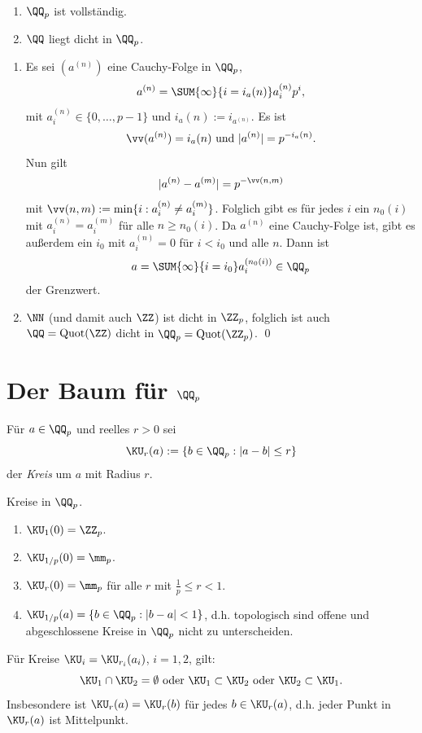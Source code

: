 \PROP\ \begin{enumerate}
\item $\QQ_p$ ist vollständig.
\item $\QQ$ liegt dicht in $\QQ_p$.
\end{enumerate}
\bew \begin{enumerate}
\item Es sei $(a^{(n)})$ eine Cauchy-Folge in $\QQ_p$,
\[
a^{(n)} = \SUM{\infty}{i=i_a(n)} a_i^{(n)} p^i,
\]
mit $a_i^{(n)}\in\{0,\ldots,p-1\}$ und $i_a(n):=i_{a^{(n)}}$.
Es ist
\[
\vv(a^{(n)}) = i_a(n) \text{ und } |a^{(n)}|=p^{-i_a(n)}.
\]
Nun gilt
\[
|a^{(n)}-a^{(m)}| = p^{-\vv(n,m)}
\]
mit $\vv(n,m):=\min\{i:a_i^{(n)}\neq a_i^{(m)}\}$.
Folglich gibt es für jedes $i$ ein $n_0(i)$ mit $a^{(n)}_i=a^{(m)}_i$
für alle $n\geq n_0(i)$.
Da $a^{(n)}$ eine Cauchy-Folge ist, gibt es außerdem ein $i_0$
mit $a_i^{(n)}=0$ für $i<i_0$ und alle $n$.
Dann ist
\[
a = \SUM{\infty}{i=i_0} a_i^{(n_0(i))} \in \QQ_p
\]
der Grenzwert.
\item $\NN$ (und damit auch $\ZZ$) ist dicht in $\ZZ_p$, 
folglich ist auch $\QQ=\mathrm{Quot}(\ZZ)$ dicht in
$\QQ_p=\mathrm{Quot}(\ZZ_p)$.
\qed
\end{enumerate}

\section{Der Baum für $\QQ_p$}\label{sec_baumQp}

\DEF Für $a\in \QQ_p$ und reelles $r>0$ sei
\[
\KU_r(a) := \{ b\in\QQ_p : |a-b|\leq r \}
\]
der \emph{Kreis}
um $a$ mit Radius $r$.

\BSP Kreise in $\QQ_p$.
\begin{enumerate}
\item $\KU_1(0)=\ZZ_p$.
\item $\KU_{1/p}(0)=\mm_p$.
\item $\KU_r(0)=\mm_p$ für alle $r$ mit $\frac{1}{p}\leq r < 1$.
\item $\KU_{1/p}(a)=\{ b\in\QQ_p:|b-a|<1 \}$, d.h. topologisch sind
offene und abgeschlossene Kreise in $\QQ_p$ nicht zu unterscheiden.
\end{enumerate}

\BEM Für Kreise $\KU_i=\KU_{r_i}(a_i)$, $i=1,2$, gilt:
\[
\KU_1\cap\KU_2=\emptyset\text{ oder }
\KU_1\subset \KU_2 \text{ oder }
\KU_2\subset \KU_1.
\]
Insbesondere ist $\KU_r(a)=\KU_r(b)$ für jedes $b\in\KU_r(a)$, d.h.
jeder Punkt in $\KU_r(a)$ ist Mittelpunkt.

